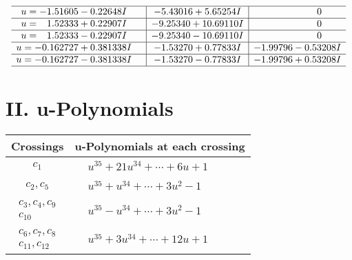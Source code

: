 \documentclass[1p]{elsarticle_modified}
\theoremstyle{definition}
\begin{document}
$$\begin{array}{c|c|c}
 \hline 
\begin{aligned}
u &= -1.51605 - 0.22648 I\end{aligned}
 & -5.43016 + 5.65254 I & \phantom{-0.000000 } 0 \\ \hline\begin{aligned}
u &= \phantom{-}1.52333 + 0.22907 I\end{aligned}
 & -9.25340 + 10.69110 I & \phantom{-0.000000 } 0 \\ \hline\begin{aligned}
u &= \phantom{-}1.52333 - 0.22907 I\end{aligned}
 & -9.25340 - 10.69110 I & \phantom{-0.000000 } 0 \\ \hline\begin{aligned}
u &= -0.162727 + 0.381338 I\end{aligned}
 & -1.53270 + 0.77833 I & -1.99796 - 0.53208 I \\ \hline\begin{aligned}
u &= -0.162727 - 0.381338 I\end{aligned}
 & -1.53270 - 0.77833 I & -1.99796 + 0.53208 I\\
 \hline 
 \end{array}$$\newpage
\newpage\renewcommand{\arraystretch}{1}
\centering \section*{ II. u-Polynomials}
\begin{tabular}{m{50pt}|m{274pt}}
Crossings & \hspace{64pt}u-Polynomials at each crossing \\
\hline $$\begin{aligned}c_{1}\end{aligned}$$&$\begin{aligned}
&u^{35}+21 u^{34}+\cdots+6 u+1
\end{aligned}$\\
\hline $$\begin{aligned}c_{2},c_{5}\end{aligned}$$&$\begin{aligned}
&u^{35}+u^{34}+\cdots+3 u^2-1
\end{aligned}$\\
\hline $$\begin{aligned}c_{3},c_{4},c_{9}\\c_{10}\end{aligned}$$&$\begin{aligned}
&u^{35}- u^{34}+\cdots+3 u^2-1
\end{aligned}$\\
\hline $$\begin{aligned}c_{6},c_{7},c_{8}\\c_{11},c_{12}\end{aligned}$$&$\begin{aligned}
&u^{35}+3 u^{34}+\cdots+12 u+1
\end{aligned}$\\
\hline
\end{tabular}\newpage\renewcommand{\arraystretch}{1}
\end{document}
